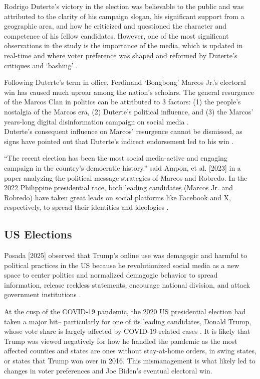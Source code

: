 Rodrigo Duterte's victory in the election was believable to the public and was attributed to the clarity of his campaign slogan, his significant support from a geographic area, and how he criticized and questioned the character and competence of his fellow candidates. However, one of the most significant observations in the study is the importance of the media, which is updated in real-time and where voter preference was shaped and reformed by Duterte’s critiques and ‘bashing’ \cite{RRL_Holmes-2016}.

Following Duterte’s term in office, Ferdinand ‘Bongbong’ Marcos Jr.’s electoral win has caused much uproar among the nation’s scholars. The general resurgence of the Marcos Clan in politics can be attributed to 3 factors: (1) the people’s nostalgia of the Marcos era, (2) Duterte’s political influence, and (3) the Marcos’ years-long digital disinformation campaign on social media \cite{RRL_Pernia-2025}.\\Duterte’s consequent influence on Marcos’ resurgence cannot be dismissed, as signs have pointed out that Duterte’s indirect endorsement led to his win \cite{RRL_Dulay-2023}.

“The recent election has been the most social media-active and engaging campaign in the country’s democratic history.” said Ampon, et al. [2023] in a paper analyzing the political message strategies of Marcos and Robredo. In the 2022 Philippine presidential race, both leading candidates (Marcos Jr. and Robredo) have taken great leads on social platforms like Facebook and X, respectively, to spread their identities and ideologies \cite{RRL_Ampon-2023}.

\subsection{US Elections}
Posada [2025] observed that Trump’s online use was demagogic and harmful to political practices in the US because he revolutionized social media as a new space to center politics and normalized demagogic behavior to spread information, release reckless statements, encourage national division, and attack government institutions \cite{RRL_Posada-2025}.

At the cusp of the COVID-19 pandemic, the 2020 US presidential election had taken a major hit– particularly for one of its leading candidates, Donald Trump, whose vote share is largely affected by COVID-19-related cases \cite{RRL_Baccini-2021}. It is likely that Trump was viewed negatively for how he handled the pandemic as the most affected counties and states are ones without stay-at-home orders, in swing states, or states that Trump won over in 2016. This mismanagement is what likely led to changes in voter preferences and Joe Biden’s eventual electoral win.

